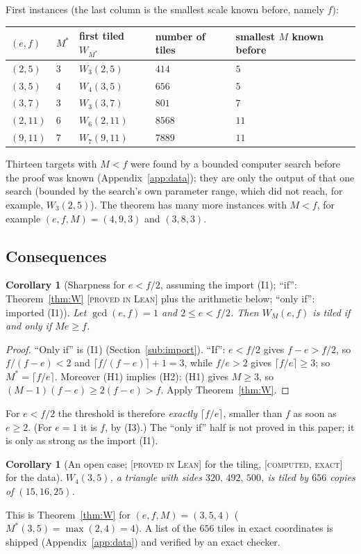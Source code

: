 \documentclass[11pt,reqno]{amsart}
\theoremstyle{plain}
\newtheorem{corollary}[theorem]{Corollary}
\theoremstyle{definition}
\newcommand{\lab}[1]{\textup{[\textsc{#1}]}}
\newcommand{\PL}{\lab{proved in Lean}}
\newcommand{\CE}{\lab{computed, exact}}
\begin{document}
First instances (the last column is the smallest scale known before, namely $f$):
\begin{center}\small
\begin{tabular}{@{}lllll@{}}
\toprule
$(e,f)$ & $M^*$ & first tiled $W_{M^*}$ & number of tiles & smallest $M$ known before\\
\midrule
$(2,5)$ & $3$ & $W_3(2,5)$ & $414$ & $5$\\
$(3,5)$ & $4$ & $W_4(3,5)$ & $656$ & $5$\\
$(3,7)$ & $3$ & $W_3(3,7)$ & $801$ & $7$\\
$(2,11)$ & $6$ & $W_6(2,11)$ & $8568$ & $11$\\
$(9,11)$ & $7$ & $W_7(9,11)$ & $7889$ & $11$\\
\bottomrule
\end{tabular}
\end{center}
Thirteen targets with $M<f$ were found by a bounded computer search before the proof was known (Appendix~\ref{app:data}); they are only the output of that one search (bounded by the search's own parameter range, which did not reach, for example, $W_3(2,5)$). The theorem has many more instances with $M<f$, for example $(e,f,M)=(4,9,3)$ and $(3,8,3)$.

\subsection{Consequences}
\begin{corollary}[Sharpness for $e<f/2$, assuming the import (I1); ``if'': Theorem~\ref{thm:W} \PL{} plus the arithmetic below; ``only if'': imported (I1)]\label{cor:sharp}
Let $\gcd(e,f)=1$ and $2\le e<f/2$. Then $W_M(e,f)$ is tiled if and only if $Me\ge f$.
\end{corollary}
\begin{proof}
``Only if'' is (I1) (Section~\ref{sub:import}). ``If'': $e<f/2$ gives $f-e>f/2$, so $f/(f-e)<2$ and $\lceil f/(f-e)\rceil+1=3$, while $f/e>2$ gives $\lceil f/e\rceil\ge3$; so $M^*=\lceil f/e\rceil$. Moreover (H1) implies (H2): (H1) gives $M\ge3$, so $(M-1)(f-e)\ge2(f-e)>f$. Apply Theorem~\ref{thm:W}.
\end{proof}
For $e<f/2$ the threshold is therefore \emph{exactly} $\lceil f/e\rceil$, smaller than $f$ as soon as $e\ge2$. (For $e=1$ it is $f$, by (I3).) The ``only if'' half is not proved in this paper; it is only as strong as the import (I1).
\begin{corollary}[An open case; \PL{} for the tiling, \CE{} for the data]\label{cor:W435}
$W_4(3,5)$, a triangle with sides $320,\,492,\,500$, is tiled by $656$ copies of $(15,16,25)$.
\end{corollary}
\noindent This is Theorem~\ref{thm:W} for $(e,f,M)=(3,5,4)$ ($M^*(3,5)=\max(2,4)=4$). A list of the $656$ tiles in exact coordinates is shipped (Appendix~\ref{app:data}) and verified by an exact checker.
\end{document}
